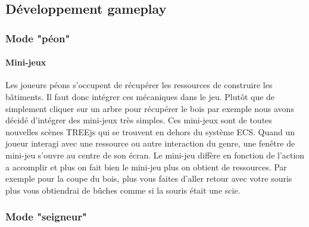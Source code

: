 
\subsection{Développement gameplay}
\subsubsection{Mode "péon"}


\paragraph{Mini-jeux}
Les joueurs péons s'occupent de récupérer les ressources de construire les bâtiments. Il faut donc intégrer ces mécaniques dans le jeu. Plutôt que de simplement cliquer sur un arbre pour récupérer le bois par exemple nous avons décidé d’intégrer des mini-jeux très simples.
Ces mini-jeux sont de toutes nouvelles scènes TREEjs qui se trouvent en dehors du système ECS. Quand un joueur interagi avec une ressource ou autre interaction du genre, une fenêtre de mini-jeu s'ouvre au centre de son écran. Le mini-jeu diffère en fonction de l'action a accomplir et plus on fait bien le mini-jeu plus on obtient de ressources. Par exemple pour la coupe du bois, plus vous faites d'aller retour avec votre souris plus vous obtiendrai de bûches comme si la souris était une scie.


\subsubsection{Mode "seigneur"}
